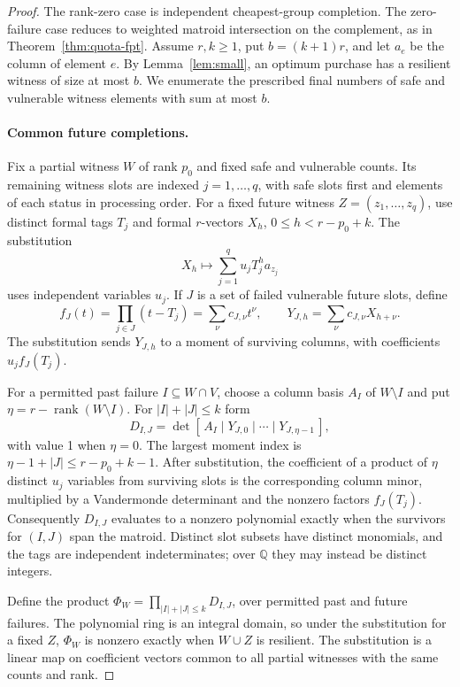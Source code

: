\documentclass[11pt]{article}
\theoremstyle{definition}
\theoremstyle{remark}\newtheorem{remark}[theorem]{Remark}
\DeclareMathOperator{\rk}{rank}
\begin{document}
\begin{proof}
The rank-zero case is independent cheapest-group completion.
The zero-failure case reduces to weighted matroid intersection
on the complement, as in Theorem~\ref{thm:quota-fpt}.
Assume $r,k\ge1$, put $b=(k+1)r$, and let $a_e$ be the column
of element $e$. By Lemma~\ref{lem:small}, an optimum purchase
has a resilient witness of size at most $b$. We enumerate
the prescribed final numbers of safe and vulnerable witness
elements with sum at most $b$.

\paragraph{Common future completions.}
Fix a partial witness $W$ of rank $p_0$ and fixed safe and
vulnerable counts. Its remaining witness slots are indexed
$j=1,\ldots,q$, with safe slots first and elements of each
status in processing order. For a fixed future witness
$Z=(z_1,\ldots,z_q)$, use distinct formal tags $T_j$ and formal
$r$-vectors $X_h$, $0\le h<r-p_0+k$. The substitution
\[
 X_h\longmapsto \sum_{j=1}^q u_j T_j^h a_{z_j}
\]
uses independent variables $u_j$. If $J$ is a set of failed
vulnerable future slots, define
\[
 f_J(t)=\prod_{j\in J}(t-T_j)=\sum_{\nu}c_{J,\nu}t^\nu,
 \qquad Y_{J,h}=\sum_{\nu}c_{J,\nu}X_{h+\nu}.
\]
The substitution sends $Y_{J,h}$ to a moment of surviving
columns, with coefficients $u_jf_J(T_j)$.

For a permitted past failure $I\subseteq W\cap V$, choose a
column basis $A_I$ of $W\setminus I$ and put
$\eta=r-\rk(W\setminus I)$. For $|I|+|J|\le k$ form
\[
 D_{I,J}=\det[\,A_I\mid Y_{J,0}\mid\cdots\mid Y_{J,\eta-1}\,],
\]
with value 1 when $\eta=0$. The largest moment index is
$\eta-1+|J|\le r-p_0+k-1$. After substitution, the coefficient
of a product of $\eta$ distinct $u_j$ variables from surviving
slots is the corresponding column minor, multiplied by a
Vandermonde determinant and the nonzero factors $f_J(T_j)$.
Consequently $D_{I,J}$ evaluates to a nonzero polynomial
exactly when the survivors for $(I,J)$ span the matroid.
Distinct slot subsets have distinct monomials, and the tags
are independent indeterminates; over $\mathbb Q$ they may
instead be distinct integers.

Define the product $\Phi_W=\prod_{|I|+|J|\le k}D_{I,J}$,
over permitted past and future failures. The polynomial ring is
an integral domain, so under the substitution for a fixed $Z$,
$\Phi_W$ is nonzero exactly when $W\cup Z$ is resilient.
The substitution is a linear map on coefficient vectors
common to all partial witnesses with the same counts and rank.


\end{proof}
\end{document}
